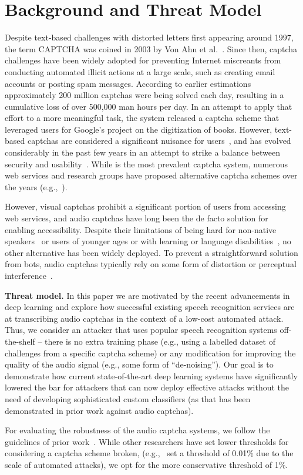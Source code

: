 \section{Background and Threat Model}
\label{sec:background}

Despite text-based challenges with distorted letters first appearing around 1997,
the term CAPTCHA was coined in 2003 by Von Ahn et al.~\cite{captcha}. Since 
then, captcha challenges have been widely adopted for preventing Internet 
miscreants from conducting automated illicit actions at a large scale, such as 
creating email accounts or posting spam messages. According to earlier estimations~\cite{captcha_stats}
approximately 200 million captchas were being solved each day, resulting in a
cumulative loss of over 500,000 man hours per day. In an attempt to apply that 
effort to a more meaningful task, the \re system released a captcha scheme that
leveraged users for Google's project on the digitization of books. However, 
text-based captchas are considered a significant nuisance for users~\cite{scientific_american},
and \re has evolved considerably in the past few years in an attempt to strike 
a balance between security and usability~\cite{recaptcha}. While \re is the
most prevalent captcha system, numerous web services and research groups have 
proposed alternative captcha schemes over the years (e.g.,~\cite{Chew04,asirra,dcaptcha}).

However, visual captchas prohibit a significant portion of users from accessing 
web services, and audio captchas have long been the de facto solution for
enabling accessibility. Despite their limitations of being hard for
non-native speakers~\cite{yan2008usability} or users of younger ages 
or with learning or language disabilities~\cite{schlaikjer2007dual},
no other alternative has been widely deployed.
To prevent a straightforward solution from bots, audio captchas 
typically rely on some form of distortion or perceptual interference~\cite{shinn2008object}.

\textbf{Threat model.} In this paper we are motivated by the recent advancements 
in deep learning and explore how successful existing speech recognition services
are at transcribing audio captchas in the context of a low-cost automated attack.
Thus, we consider an attacker that uses popular speech recognition systems off-the-shelf --
there is no extra training phase (e.g., using a labelled dataset of challenges from 
a specific captcha scheme) or any modification for improving the quality of the audio 
signal (e.g., some form of ``de-noising''). Our goal is to demonstrate how current 
state-of-the-art deep learning systems have significantly lowered the bar for attackers
that can now deploy effective attacks without the need of developing sophisticated 
custom classifiers (as that has been demonstrated in prior work against audio captchas).

For evaluating the robustness of the 
audio captcha systems, we follow the guidelines of prior work~\cite{bursztein2011failure}.
While other researchers have set lower thresholds for considering a captcha scheme 
broken, (e.g.,~\cite{Chellapilla} set a threshold of 0.01\% due to the scale of 
automated attacks), we opt for the more conservative threshold of 1\%.
